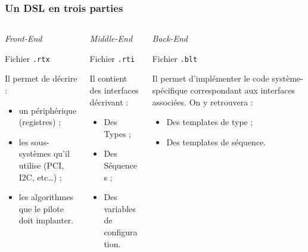 \documentclass[]{beamer}
\begin{document}
\begin{frame}
\frametitle{Un DSL en trois parties}
\begin{columns}[c]
    
    \begin{column}[l,T]{115pt}
        \begin{center} \large{\itshape{Front-End}} \end{center}
        \scriptsize{
            \begin{center} Fichier \texttt{.rtx} \end{center}
            Il permet de décrire :
            \begin{itemize}
                \item un périphérique (registres) ;
                \item les sous-systèmes qu'il utilise (PCI, I2C, etc\ldots) ;
                \item les algorithmes que le pilote doit implanter.
            \end{itemize}
        }
    \end{column}
    
    \begin{column}[c,T]{115pt}
        \begin{center} \large{\itshape{Middle-End}} \end{center}
        \scriptsize{
            \begin{center} Fichier \texttt{.rti} \end{center}
            Il contient des interfaces décrivant :
            \begin{itemize}
                \item Des Types ;
                \item Des Séquences ;
                \item Des variables de configuration.
            \end{itemize}
        }
    \end{column}
    
    \begin{column}[r,T]{115pt}
        \begin{center} \large{\itshape{Back-End}} \end{center}
        \scriptsize{
            \begin{center} Fichier \texttt{.blt} \end{center}
            Il permet d'implémenter le code système-spécifique correspondant
            aux interfaces associées. On y retrouvera :
            \begin{itemize}
                \item Des templates de type ;
                \item Des templates de séquence.
            \end{itemize}
        }
    \end{column}

\end{columns}
\end{frame}
\end{document}
